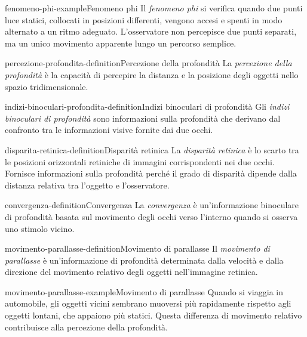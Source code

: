 \documentclass[preview]{standalone}
\begin{document}
\begin{snippetexample}{fenomeno-phi-example}{Fenomeno phi}
    Il \emph{fenomeno phi} si verifica quando due punti luce statici, collocati
    in posizioni differenti, vengono accesi e spenti in modo alternato a un
    ritmo adeguato. L'osservatore non percepisce due punti separati, ma un unico
    movimento apparente lungo un percorso semplice.
\end{snippetexample}

\begin{snippetdefinition}{percezione-profondita-definition}{Percezione della profondità}
    La \emph{percezione della profondità} è la capacità di percepire la distanza
    e la posizione degli oggetti nello spazio tridimensionale.
\end{snippetdefinition}

\begin{snippetdefinition}{indizi-binoculari-profondita-definition}{Indizi binoculari di profondità}
    Gli \emph{indizi binoculari di profondità} sono informazioni sulla
    profondità che derivano dal confronto tra le informazioni visive fornite dai
    due occhi.
\end{snippetdefinition}

\begin{snippetdefinition}{disparita-retinica-definition}{Disparità retinica}
    La \emph{disparità retinica} è lo scarto tra le posizioni orizzontali
    retiniche di immagini corrispondenti nei due occhi. Fornisce informazioni
    sulla profondità perché il grado di disparità dipende dalla distanza
    relativa tra l'oggetto e l'osservatore.
\end{snippetdefinition}

\begin{snippetdefinition}{convergenza-definition}{Convergenza}
    La \emph{convergenza} è un'informazione binoculare di profondità basata sul
    movimento degli occhi verso l'interno quando si osserva uno stimolo vicino.
\end{snippetdefinition}

\begin{snippetdefinition}{movimento-parallasse-definition}{Movimento di parallasse}
    Il \emph{movimento di parallasse} è un'informazione di profondità
    determinata dalla velocità e dalla direzione del movimento relativo degli
    oggetti nell'immagine retinica.
\end{snippetdefinition}

\begin{snippetexample}{movimento-parallasse-example}{Movimento di parallasse}
    Quando si viaggia in automobile, gli oggetti vicini sembrano muoversi più
    rapidamente rispetto agli oggetti lontani, che appaiono più statici. Questa
    differenza di movimento relativo contribuisce alla percezione della
    profondità.
\end{snippetexample}
\end{document}
